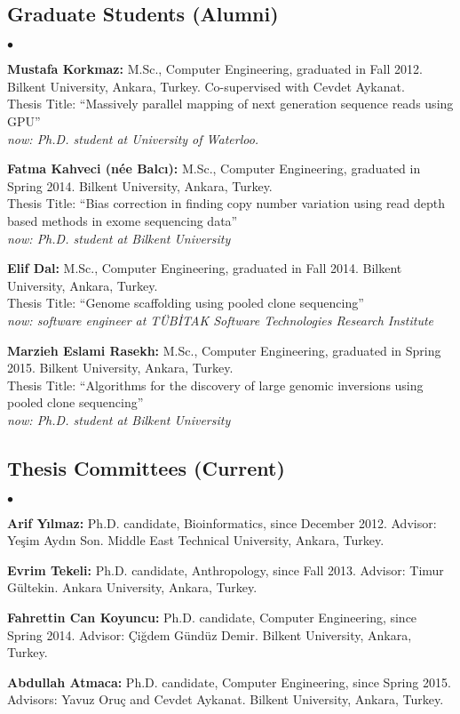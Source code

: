 \documentclass[margin,line]{res}
\newenvironment{list2}{
  \begin{list}{$\bullet$}{%
      \setlength{\itemsep}{0in}
      \setlength{\parsep}{0in} \setlength{\parskip}{0in}
      \setlength{\topsep}{0in} \setlength{\partopsep}{0in} 
      \setlength{\leftmargin}{0.2in}}}{\end{list}}
\begin{document}
\begin{resume}
\vspace*{-.4cm}
\subsection{\small \sc Graduate Students (Alumni)}
\begin{list2}
\item
 {\bf Mustafa Korkmaz:} M.Sc., Computer Engineering, graduated in Fall 2012.
  Bilkent University, Ankara, Turkey. Co-supervised with Cevdet Aykanat.\\
  Thesis Title: ``Massively parallel mapping of next generation sequence reads using GPU''\\
  {\it now: Ph.D. student at University of Waterloo.}
\item
  {\bf Fatma Kahveci (n\'{e}e Balc{\i}):} M.Sc., Computer Engineering, graduated in Spring 2014.
  Bilkent University, Ankara, Turkey.\\
  Thesis Title: ``Bias correction in finding copy number variation using read depth based methods in exome sequencing data''\\
  {\it now: Ph.D. student at Bilkent University}
\item
  {\bf Elif Dal:} M.Sc., Computer Engineering, graduated in Fall 2014.
  Bilkent University, Ankara, Turkey.\\
  Thesis Title: ``Genome scaffolding using pooled clone sequencing''\\
  {\it now: software engineer at TÜBİTAK Software Technologies Research Institute}
\item
  {\bf Marzieh Eslami Rasekh:} M.Sc., Computer Engineering, graduated in Spring 2015.
  Bilkent University, Ankara, Turkey.\\
  Thesis Title: ``Algorithms for the discovery of large genomic inversions using pooled clone sequencing''\\
  {\it now: Ph.D. student at Bilkent University}
\end{list2}

\vspace*{-.6cm}
\subsection{\small \sc Thesis Committees (Current)}
\begin{list2}
\item
  {\bf Arif Yılmaz:} Ph.D. candidate, Bioinformatics, since December 2012.
  Advisor: Yeşim Aydın Son.
  Middle East Technical University, Ankara, Turkey.
\item 
  {\bf Evrim Tekeli:} Ph.D. candidate, Anthropology, since Fall 2013.
  Advisor: Timur G\"{u}ltekin.
  Ankara University, Ankara, Turkey. 
\item
  {\bf Fahrettin Can Koyuncu:} Ph.D. candidate, Computer Engineering, since Spring 2014.
  Advisor: Çiğdem Gündüz Demir.
  Bilkent University, Ankara, Turkey.
\item
  {\bf Abdullah Atmaca:} Ph.D. candidate, Computer Engineering, since Spring 2015.
  Advisors: Yavuz Oruç and Cevdet Aykanat.
  Bilkent University, Ankara, Turkey.
\end{list2}



\end{resume}
\end{document}
